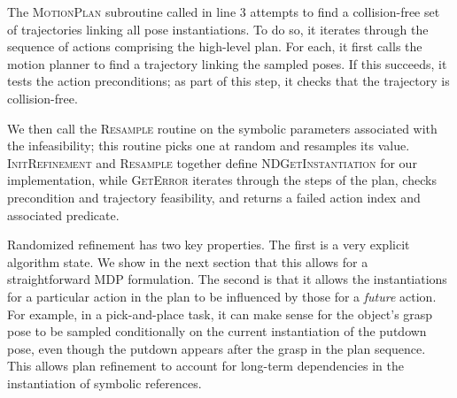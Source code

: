 The \textsc{MotionPlan} subroutine called in line 3 attempts to
find a collision-free set of trajectories linking all pose instantiations.
To do so, it iterates through the sequence of actions comprising the high-level plan.
For each, it first calls the motion planner to find a trajectory
linking the sampled poses. If this succeeds, it tests the action preconditions;
as part of this step, it checks that the trajectory is collision-free.

We then call the \textsc{Resample} routine on the symbolic parameters
associated with the infeasibility; this routine picks one at random and
resamples its value. \textsc{InitRefinement} and \textsc{Resample} together define
\textsc{NDGetInstantiation} for our implementation, while \textsc{GetError} iterates
through the steps of the plan, checks precondition and trajectory feasibility, and returns
a failed action index and associated predicate. 

Randomized refinement has two key properties. The first is a very explicit algorithm state.
We show in the next section that this allows for a straightforward MDP
formulation. The second is that
it allows the instantiations for a particular action in
the plan to be influenced by those for a \emph{future} action. For example, in a
pick-and-place task, it can make sense for the object's grasp pose to be sampled
conditionally on the current instantiation of the putdown pose, even though the putdown
appears after the grasp in the plan sequence. This allows plan refinement to account for
long-term dependencies in the instantiation of symbolic references.
